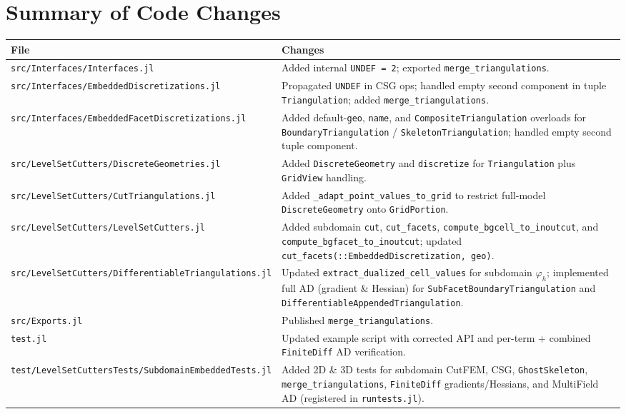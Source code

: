 \documentclass[11pt,a4paper]{article}
\begin{document}
\section{Summary of Code Changes}
\begin{table}[h!]
\centering
\small
\begin{tabular}{@{}lp{9.8cm}@{}}
\toprule
\textbf{File} & \textbf{Changes} \\
\midrule
\texttt{src/Interfaces/Interfaces.jl} & Added internal \texttt{UNDEF = 2}; exported \texttt{merge\_triangulations}. \\
\texttt{src/Interfaces/EmbeddedDiscretizations.jl} & Propagated \texttt{UNDEF} in CSG ops; handled empty second component in tuple \texttt{Triangulation}; added \texttt{merge\_triangulations}. \\
\texttt{src/Interfaces/EmbeddedFacetDiscretizations.jl} & Added default-\texttt{geo}, \texttt{name}, and \texttt{CompositeTriangulation} overloads for \texttt{BoundaryTriangulation} / \texttt{SkeletonTriangulation}; handled empty second tuple component. \\
\texttt{src/LevelSetCutters/DiscreteGeometries.jl} & Added \texttt{DiscreteGeometry} and \texttt{discretize} for \texttt{Triangulation} plus \texttt{GridView} handling. \\
\texttt{src/LevelSetCutters/CutTriangulations.jl} & Added \texttt{\_adapt\_point\_values\_to\_grid} to restrict full-model \texttt{DiscreteGeometry} onto \texttt{GridPortion}. \\
\texttt{src/LevelSetCutters/LevelSetCutters.jl} & Added subdomain \texttt{cut}, \texttt{cut\_facets}, \texttt{compute\_bgcell\_to\_inoutcut}, and \texttt{compute\_bgfacet\_to\_inoutcut}; updated \texttt{cut\_facets(::EmbeddedDiscretization, geo)}. \\
\texttt{src/LevelSetCutters/DifferentiableTriangulations.jl} & Updated \texttt{extract\_dualized\_cell\_values} for subdomain $\varphi_h$; implemented full AD (gradient \& Hessian) for \texttt{SubFacetBoundaryTriangulation} and \texttt{DifferentiableAppendedTriangulation}. \\
\texttt{src/Exports.jl} & Published \texttt{merge\_triangulations}. \\
\texttt{test.jl} & Updated example script with corrected API and per-term + combined \texttt{FiniteDiff} AD verification. \\
\texttt{test/LevelSetCuttersTests/SubdomainEmbeddedTests.jl} & Added 2D \& 3D tests for subdomain CutFEM, CSG, \texttt{GhostSkeleton}, \texttt{merge\_triangulations}, \texttt{FiniteDiff} gradients/Hessians, and MultiField AD (registered in \texttt{runtests.jl}). \\
\bottomrule
\end{tabular}
\end{table}
\end{document}
